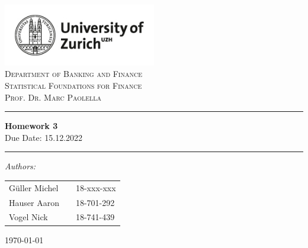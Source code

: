 \begin{titlepage}
\begin{center}
\includegraphics[width = 0.5\textwidth]{images/UZH_logo.png}\\
\textsc{Department of Banking and Finance}\\
\textsc{\Large Statistical Foundations for Finance}\\
\textsc{\Large Prof. Dr. Marc Paolella}\\
\vbox{ }

\hrule
\vspace{0.4cm}
{ \huge \bfseries Homework 3}\\
{Due Date: 15.12.2022}
\vspace{0.4cm}
\hrule
\vspace{1.5cm}

\large
\emph{Authors:}\\
    \begin{table}[hb]
        \centering
        \begin{tabular}{lll}
            Güller Michel   && 18-xxx-xxx \\
            Hauser Aaron    && 18-701-292 \\
            Vogel Nick      && 18-741-439 \\
        \end{tabular}
        \label{tab:my_label}
    \end{table}
\vfill

{\large \today}
\end{center}
\end{titlepage}